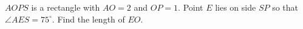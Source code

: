 $AOPS$ is a rectangle with $AO=2$ and $OP=1$. Point $E$ lies on side $SP$ so that $\angle AES=75^\circ$. Find the length of $EO$.
